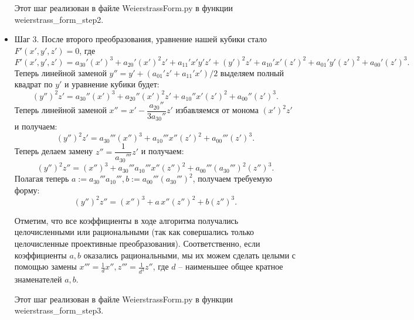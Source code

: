 \begin{itemize}[leftmargin=0.6cm]
    Этот шаг реализован в файле \textsf{WeierstrassForm.py} в функции
    \textsf{weierstrass\_form\_step2}.

    \item Шаг 3. После второго преобразования, уравнение нашей кубики стало \(F'(x',
    y', z') = 0\), где 
    \[
    F'(x', y', z') = a_{30}' \left( x' \right)^3 + a_{20}' \left( x' \right)^2
    z' + a_{11}' x' y' z' + \left( y' \right)^2 z' + a_{10}' x' \left(
    z' \right)^2 + a_{01}' y' \left( z' \right)^2 + a_{00}' \left( z'
    \right)^3
    .\] 
    Теперь линейной заменой \(y'' =  y' + (a_{01}' z' + a_{11}' x')/2\) выделяем полный
    квадрат по \(y'\) и уравнение кубики будет:
    \[
    \left( y'' \right)^2 z' = a_{30}'' \left( x' \right)^3 + a_{20}'' \left( x' \right)^2
    z' + a_{10}'' x' \left( z' \right)^2 + a_{00}'' \left( z' \right)^3
    .\] 
    Теперь линейной заменой \(x'' = x' - \dfrac{a_{20}''}{3 a_{30}''} z'\)
    избавляемся от монома \(\left( x' \right)^2 z'\) и получаем:
    \[
    \left( y'' \right)^2 z' = a_{30}''' \left( x'' \right)^3 + a_{10}''' x''
    \left( z' \right)^2 + a_{00}''' \left( z' \right)^3
    .\] 
    Теперь делаем замену \(z'' = \dfrac{1}{a_{30}'''} z'\) и получаем:
    \[
    \left( y'' \right)^2 z'' = \left( x'' \right)^3 + a_{30}''' a_{10}''' x''
    \left( z'' \right)^2 + a_{00}''' \left( a_{30}''' \right)^2 \left( z'' \right)^3
    .\] 
    Полагая теперь \(a := a_{30}''' a_{10}''', b := a_{00}''' \left( a_{30}'''
    \right)^2\), получаем требуемую форму: 
    \[
    \left( y'' \right)^2 z'' = \left( x'' \right)^3 + a \, x''
    \left( z'' \right)^2 + b \left( z'' \right)^3
    .\] 

    \begin{remark*}
        Отметим, что все коэффициенты в ходе алгоритма получались
        целочисленными или рациональными (так как совершались только
        целочисленные проективные преобразования). Соответственно, если
        коэффициенты \(a, b\) оказались рациональными, мы их можем сделать
        целыми с помощью замены \(x''' = \frac{1}{d} x'', z''' = \frac{1}{d^3}
        z''\), где \(d\) -- наименьшее общее кратное знаменателей \(a, b\).
    \end{remark*}

    Этот шаг реализован в файле \textsf{WeierstrassForm.py} в функции
    \textsf{weierstrass\_form\_step3}.
\end{itemize}


\bigskip
\bigskip
